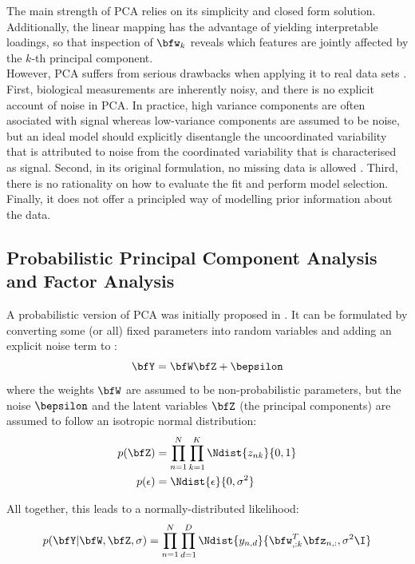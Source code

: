  
The main strength of PCA relies on its simplicity and closed form solution. Additionally, the linear mapping has the advantage of yielding interpretable loadings, so that inspection of $\bfw_k$ reveals which features are jointly affected by the $k$-th principal component.\\
However, PCA suffers from serious drawbacks when applying it to real data sets \cite{Li2017b}. First, biological measurements are inherently noisy, and there is no explicit account of noise in PCA. In practice, high variance components are often asociated with signal whereas low-variance components are assumed to be noise, but an ideal model should explicitly disentangle the uncoordinated variability that is attributed to noise from the coordinated variability that is characterised as signal. Second, in its original formulation, no missing data is allowed \cite{Ilin2010}. Third, there is no rationality on how to evaluate the fit and perform model selection. Finally, it does not offer a principled way of modelling prior information about the data.

\subsection{Probabilistic Principal Component Analysis and Factor Analysis} \label{section:probabilistic_pca}
A probabilistic version of PCA was initially proposed in \cite{Tipping1999}. It can be formulated by converting some (or all) fixed parameters into random variables and adding an explicit noise term to :
\begin{equation}
	\bfY = \bfW \bfZ + \bepsilon
\end{equation}
where the weights $\bfW$ are assumed to be non-probabilistic parameters, but the noise $\bepsilon$ and the latent variables $\bfZ$ (the principal components) are assumed to follow an isotropic normal distribution:
\begin{align*}
	p(\bfZ) &= \prod_{n=1}^{N} \prod_{k=1}^{K} \Ndist{z_{nk}}{0,1} \\
	p(\epsilon) &= \Ndist {\epsilon}{0,\sigma^2}
\end{align*}

All together, this leads to a normally-distributed likelihood:
\begin{equation} \label{eq:ppca_lik}
	p(\bfY|\bfW,\bfZ,\sigma) = \prod_{n=1}^{N} \prod_{d=1}^{D} \Ndist{y_{n,d}}{\bfw_{,:k}^T \bfz_{n,:},\sigma^2 \I}
\end{equation}

